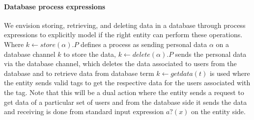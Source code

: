  \paragraph{Database process expressions }
We envision storing, retrieving, and deleting data in a database through process expressions to explicitly model if the right entity can perform these operations. 
 Where $ k \leftarrow store(\alpha). P $ defines a process as sending personal data $ \alpha $  on a database channel $ k$ to store the data,   $ k \leftarrow delete(\alpha) . P$ sends the personal data via the database channel, which deletes the data associated to users from the database and to retrieve data from database term $ k \leftarrow getdata(t) $ is used where the entity sends valid tags to get the respective data for the users associated with the tag. 
Note that this will be a dual action where the entity sends a request to get data of a particular set of users and from the database side it sends the data and receiving is done from standard input expression $ a?(x)$ on the entity side.
   
